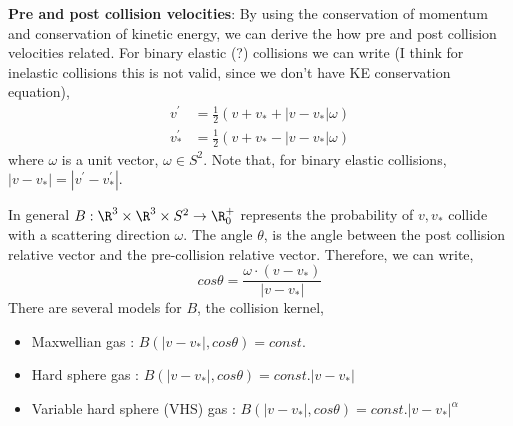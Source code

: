 \textbf{Pre and post collision velocities}: By using the conservation of momentum and conservation of kinetic energy, we can derive the how pre and post collision velocities related. For binary elastic (?) collisions we can write (I think for inelastic collisions this is not valid, since we don't have KE conservation equation), 
\begin{align}
    v^\prime  &= \frac{1}{2} (v + v_* + |v-v_*| \omega) \\
    v_*^\prime  &= \frac{1}{2} (v + v_* - |v-v_*| \omega)
\end{align} where $\omega$ is a unit vector, $\omega \in S^2$. Note that, for binary elastic collisions, $|v-v_*| = |v^\prime-v_*^\prime|$.

In general $B : \R^3 \times \R^3 \times S^2 \rightarrow \R_{0}^+$ represents the probability of $v,v_*$ collide with a scattering direction $\omega$. The angle $\theta$, is the angle between the post collision relative vector and the pre-collision relative vector. Therefore, we can write, 
\begin{equation}
    cos\theta = \frac{\omega \cdot (v-v_*)}{|v-v_*|}
\end{equation}
There are several models for $B$, the collision kernel,
\begin{itemize}
    \item Maxwellian gas : $B(|v-v_*|,cos\theta) = const.$
    \item Hard sphere gas : $B(|v-v_*|,cos\theta) = const.|v-v_*|$
    \item Variable hard sphere (VHS) gas : $B(|v-v_*|,cos\theta) = const. |v-v_*|^\alpha$
\end{itemize}

%
%
%





